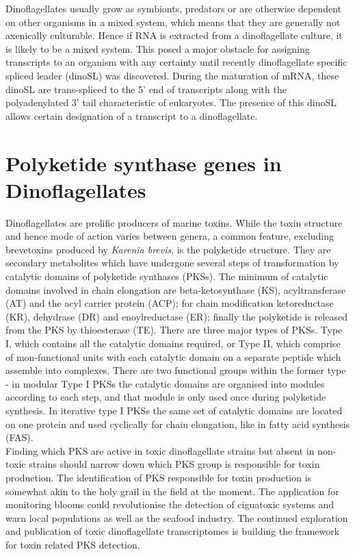 \documentclass[12pt]{article}
\begin{document}
Dinoflagellates usually grow as symbionts, predators or are otherwise dependent on other organisms in a mixed system, which means that they are generally not axenically culturable. Hence if RNA is extracted from a dinoflagellate culture, it is likely to be a mixed system. This posed a major obstacle for assigning transcripts to an organism with any certainty until recently dinoflagellate specific spliced leader (dinoSL) was discovered. During the maturation of mRNA, these dinoSL are trans-spliced to the 5' end of transcripts along with the polyadenylated 3' tail characteristic of eukaryotes. The presence of this dinoSL allows certain designation of a transcript to a dinoflagellate. 

\section{Polyketide synthase genes in Dinoflagellates}
Dinoflagellates are prolific producers of marine toxins. While the toxin structure and hence mode of action varies between genera, a common feature, excluding brevetoxins produced by \emph{Karenia brevis}, is the polyketide structure. They are secondary metabolites which have undergone several steps of transformation by catalytic domains of polyketide synthases (PKSs). The minimum of catalytic domains involved in chain elongation are beta-ketosynthase (KS), acyltransferase (AT) and the acyl carrier protein (ACP); for chain modification ketoreductase (KR), dehydrase (DR) and enoylreductase (ER); finally the polyketide is released from the PKS by thioesterase (TE). There are three major types of PKSs. Type I, which contains all the catalytic domains required, or Type II, which comprise of mon-functional units with each catalytic domain on a separate peptide which assemble into complexes. There are two functional groups within the former type - in modular Type I PKSs the catalytic domains are organised into modules according to each step, and that module is only used once during polyketide synthesis. In iterative type I PKSs the same set of catalytic domains are located on  one protein and used cyclically for chain elongation, like in fatty acid synthesis (FAS).\\
Finding which PKS are active in toxic dinoflagellate strains but absent in non-toxic strains should narrow down which PKS group is responsible for toxin production. The identification of PKS responsible for toxin production is somewhat akin to the holy grail in the field at the moment. The application for monitoring blooms could revolutionise the detection of ciguatoxic systems and warn local populations as well as the seafood industry.
The continued exploration and publication of toxic dinoflagellate transcriptomes is building the framework for toxin related PKS detection. 
\end{document}

